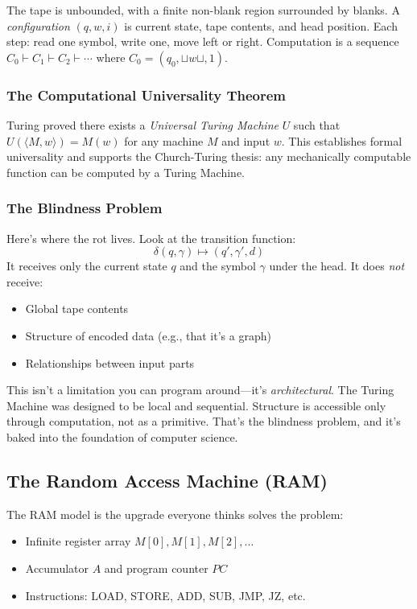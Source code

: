 The tape is unbounded, with a finite non-blank region surrounded by blanks. A \textit{configuration} $(q, w, i)$ is current state, tape contents, and head position. Each step: read one symbol, write one, move left or right. Computation is a sequence $C_0 \vdash C_1 \vdash C_2 \vdash \cdots$ where $C_0 = (q_0, \sqcup w \sqcup, 1)$.

\subsubsection{The Computational Universality Theorem}

Turing proved there exists a \textit{Universal Turing Machine} $U$ such that $U(\langle M, w \rangle) = M(w)$ for any machine $M$ and input $w$. This establishes formal universality and supports the Church-Turing thesis: any mechanically computable function can be computed by a Turing Machine.

\subsubsection{The Blindness Problem}

Here's where the rot lives. Look at the transition function:
\[
\delta(q, \gamma) \mapsto (q', \gamma', d)
\]
It receives only the current state $q$ and the symbol $\gamma$ under the head. It does \textit{not} receive:
\begin{itemize}
    \item Global tape contents
    \item Structure of encoded data (e.g., that it's a graph)
    \item Relationships between input parts
\end{itemize}

This isn't a limitation you can program around---it's \textit{architectural}. The Turing Machine was designed to be local and sequential. Structure is accessible only through computation, not as a primitive. That's the blindness problem, and it's baked into the foundation of computer science.

\subsection{The Random Access Machine (RAM)}

The RAM model is the upgrade everyone thinks solves the problem:
\begin{itemize}
    \item Infinite register array $M[0], M[1], M[2], \ldots$
    \item Accumulator $A$ and program counter $PC$
    \item Instructions: LOAD, STORE, ADD, SUB, JMP, JZ, etc.
\end{itemize}

